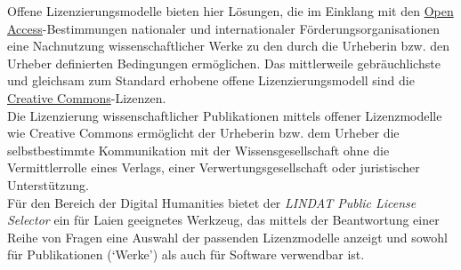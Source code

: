 \documentclass{article}
\begin{document}
        Offene Lizenzierungsmodelle bieten hier Lösungen, die im Einklang mit den \href{http://gams.uni-graz.at/o:konde.152}{Open Access}-Bestimmungen nationaler
                  und internationaler Förderungsorganisationen eine Nachnutzung wissenschaftlicher
                  Werke zu den durch die Urheberin bzw. den Urheber definierten Bedingungen
                  ermöglichen. Das mittlerweile gebräuchlichste und gleichsam zum Standard erhobene
                  offene Lizenzierungsmodell sind die \href{http://gams.uni-graz.at/o:konde.45}{Creative Commons}-Lizenzen. \\
            
        Die Lizenzierung wissenschaftlicher Publikationen mittels offener Lizenzmodelle
                  wie Creative Commons ermöglicht der Urheberin bzw. dem Urheber die selbstbestimmte
                  Kommunikation mit der Wissensgesellschaft ohne die Vermittlerrolle eines Verlags,
                  einer Verwertungsgesellschaft oder juristischer Unterstützung.\\
            
        Für den Bereich der Digital Humanities bietet der \emph{LINDAT Public
                     License Selector} ein für Laien geeignetes Werkzeug, das mittels der
                  Beantwortung einer Reihe von Fragen eine Auswahl der passenden Lizenzmodelle
                  anzeigt und sowohl für Publikationen (‘Werke’) als auch für Software verwendbar
                  ist.\\
            
\end{document}
